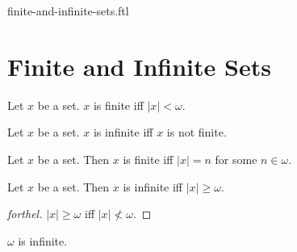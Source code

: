 \documentclass{naproche-library}
\begin{document}
\begin{smodule}{finite-and-infinite-sets.ftl}

  \section*{Finite and Infinite Sets}

  \begin{definition}[forthel,id=SET_THEORY_07_5346658235711488]
    Let $x$ be a set.
    $x$ is finite iff $|x| < \omega$.
  \end{definition}

  \begin{definition}[forthel,id=SET_THEORY_07_8295412068777984]
    Let $x$ be a set.
    $x$ is infinite iff $x$ is not finite.
  \end{definition}

  \begin{proposition}[forthel,id=SET_THEORY_07_3806229474312192]
    Let $x$ be a set.
    Then $x$ is finite iff $|x| = n$ for some $n \in \omega$.
  \end{proposition}

  \begin{proposition}[forthel,id=SET_THEORY_07_3174577070931968]
    Let $x$ be a set.
    Then $x$ is infinite iff $|x| \geq \omega$.
  \end{proposition}
  \begin{proof}[forthel]
    $|x| \geq \omega$ iff $|x| \nless \omega$.
  \end{proof}

  \begin{proposition}[forthel,id=SET_THEORY_07_9154385075632368]
    $\omega$ is infinite.
  \end{proposition}
\end{smodule}
\end{document}

